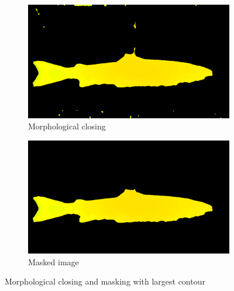 \begin{figure}[H]
    \medskip
    \begin{subfigure}{0.48\textwidth}
        \includegraphics[width=\linewidth]{images/implementation/5_closing_on_color_filtered_image}
        \caption{Morphological closing} 
        \label{fig:morphological_closing}
    \end{subfigure}\hspace*{\fill}
    \begin{subfigure}{0.48\textwidth}
        \includegraphics[width=\linewidth]{images/implementation/6_masked_source}
        \caption{Masked image} 
        \label{fig:masked_source}
    \end{subfigure}
    \caption{Morphological closing and masking with largest contour} 
    \label{fig:algorithm}
\end{figure}


